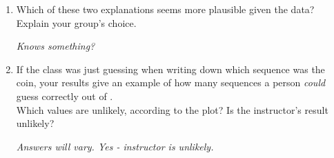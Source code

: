 \begin{enumerate}
Two possible explanations for an unusual result:
  \begin{itemize}
  \item Your instructor was merely guessing which sequence was
    generated by the coin.  If this is the case, how many times would
    you expect the instructor to have been correct? 
\begin{students}
  \vspace{1cm}
\end{students}    
\begin{key}
   {\it Half the time.}
\end{key}
 
  \item Your instructor has super secret knowledge of randomness and
    could detect the fraudulent sequences.  If this is the case, how
    many times would you expect the instructor to have been correct?
    \textit{Hint: you do not need to specify a number here, just a
      direction from a particular number.} 
\begin{students}
  \vspace{1cm}
\end{students}    
\begin{key}
   {\it More than half.}
\end{key}
 
  \end{itemize}

  \item Which of these two explanations seems more plausible given the
    data?  Explain your group's choice.
\begin{students}
  \vspace{1cm}
\end{students}    
\begin{key}
   {\it Knows something?}
\end{key}
 
\item If the class was just guessing when writing down which sequence
  was the coin, your results give an example of how many sequences a
  person \textit{could} guess correctly out of
  \underline{\hspace{1cm}}.\\
 Which values are unlikely, according to the plot?
 Is the instructor's result unlikely? 
\begin{students}
  \vspace{1cm}
\end{students}    
\begin{key}
   {\it Answers will vary. Yes - instructor is unlikely.}
\end{key}


\end{enumerate}
